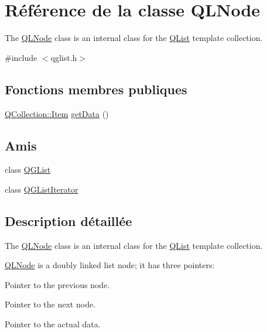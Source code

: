 \hypertarget{class_q_l_node}{}\section{Référence de la classe Q\+L\+Node}
\label{class_q_l_node}


The \hyperlink{class_q_l_node}{Q\+L\+Node} class is an internal class for the \hyperlink{class_q_list}{Q\+List} template collection.  




{\ttfamily \#include $<$qglist.\+h$>$}

\subsection*{Fonctions membres publiques}
\begin{DoxyCompactItemize}
\item 
\hyperlink{class_q_collection_ac6f3ddbf999e31fb797927f71ae6b5d7}{Q\+Collection\+::\+Item} \hyperlink{class_q_l_node_a7ed136ea4cd9729dd3b37bd904cc0e62}{get\+Data} ()
\end{DoxyCompactItemize}
\subsection*{Amis}
\begin{DoxyCompactItemize}
\item 
class \hyperlink{class_q_l_node_a9bfde3c3259271cb86b87bd78b399dd5}{Q\+G\+List}
\item 
class \hyperlink{class_q_l_node_a13dc100371e8931a394e57af8df9fbb3}{Q\+G\+List\+Iterator}
\end{DoxyCompactItemize}


\subsection{Description détaillée}
The \hyperlink{class_q_l_node}{Q\+L\+Node} class is an internal class for the \hyperlink{class_q_list}{Q\+List} template collection. 

\hyperlink{class_q_l_node}{Q\+L\+Node} is a doubly linked list node; it has three pointers\+: 
\begin{DoxyEnumerate}
\item Pointer to the previous node. 
\item Pointer to the next node. 
\item Pointer to the actual data. 
\end{DoxyEnumerate}

